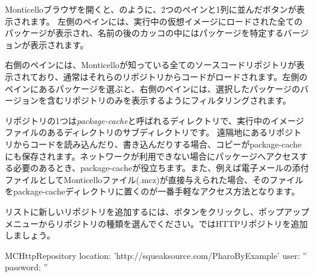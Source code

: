 \documentclass[a4paper,10pt,twoside]{book}
\begin{document}
Monticelloブラウザを開くと、のように、2つのペインと1列に並んだボタンが表示されます。
左側のペインには、実行中の仮想イメージにロードされた全てのパッケージが表示され、名前の後のカッコの中にはパッケージを特定するバージョンが表示されます。

右側のペインには、Monticelloが知っている全てのソースコードリポジトリが表示されており、通常はそれらのリポジトリからコードがロードされます。左側のペインにあるパッケージを選ぶと、右側のペインには、選択したパッケージのバージョンを含むリポジトリのみを表示するようにフィルタリングされます。

リポジトリの1つは\emph{package-cache}と呼ばれるディレクトリで、実行中のイメージファイルのあるディレクトリのサブディレクトリです。
遠隔地にあるリポジトリからコードを読み込んだり、書き込んだりする場合、コピーがpackage-cacheにも保存されます。ネットワークが利用できない場合にパッケージへアクセスする必要のあるとき、package-cacheが役立ちます。また、例えば電子メールの添付ファイルとしてMonticelloファイル(.mcz)が直接与えられた場合、そのファイルをpackage-cacheディレクトリに置くのが一番手軽なアクセス方法となります。

リストに新しいリポジトリを追加するには、ボタンをクリックし、ポップアップメニューからリポジトリの種類を選んでください。ではHTTPリポジトリを追加しましょう。

\begin{code}{}
MCHttpRepository
location: 'http://squeaksource.com/PharoByExample'
user: ''
password: ''
\end{code}
\end{document}
